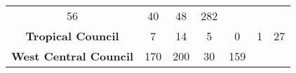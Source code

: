 \documentclass[]{article}
\begin{document}
\begin{longtable}[]{@{}ccccccc@{}}
\begin{minipage}[t]{0.14\columnwidth}
56\strut
\end{minipage} & \begin{minipage}[t]{0.05\columnwidth}\centering\strut
40\strut
\end{minipage} & \begin{minipage}[t]{0.05\columnwidth}\centering\strut
48\strut
\end{minipage} & \begin{minipage}[t]{0.05\columnwidth}\centering\strut
282\strut
\end{minipage}\tabularnewline
\begin{minipage}[t]{0.26\columnwidth}\centering\strut
\textbf{Tropical Council}\strut
\end{minipage} & \begin{minipage}[t]{0.13\columnwidth}\centering\strut
7\strut
\end{minipage} & \begin{minipage}[t]{0.14\columnwidth}\centering\strut
14\strut
\end{minipage} & \begin{minipage}[t]{0.14\columnwidth}\centering\strut
5\strut
\end{minipage} & \begin{minipage}[t]{0.05\columnwidth}\centering\strut
0\strut
\end{minipage} & \begin{minipage}[t]{0.05\columnwidth}\centering\strut
1\strut
\end{minipage} & \begin{minipage}[t]{0.05\columnwidth}\centering\strut
27\strut
\end{minipage}\tabularnewline
\begin{minipage}[t]{0.26\columnwidth}\centering\strut
\textbf{West Central Council}\strut
\end{minipage} & \begin{minipage}[t]{0.13\columnwidth}\centering\strut
170\strut
\end{minipage} & \begin{minipage}[t]{0.14\columnwidth}\centering\strut
200\strut
\end{minipage} & \begin{minipage}[t]{0.14\columnwidth}\centering\strut
30\strut
\end{minipage} & \begin{minipage}[t]{0.05\columnwidth}\centering\strut
159\strut
\end{minipage} & \begin{minipage}[t]{0.05\columnwidth}\centering\strut

\end{minipage}
\end{longtable}
\end{document}
